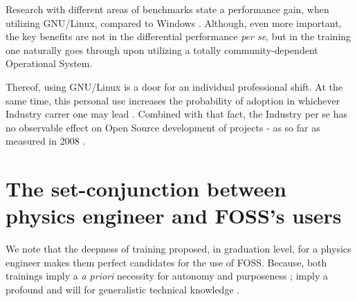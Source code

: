 \documentclass[
12pt,				%
openright,			%
oneside,			%
a4paper,			%
brazil,				%
english,			%
]{abntex2}
\begin{document}
Research with different areas of benchmarks state a performance gain, when utilizing GNU/Linux, compared to Windows \cite{sulaiman2021comparison}. Although, even more important, the key benefits are not in the differential performance \textit{per se}, but in the training one naturally goes through upon utilizing a totally community-dependent Operational System. 

Thereof, using GNU/Linux is a door for an individual professional shift. At the same time, this personal use increases the probability of adoption in whichever Industry carrer one may lead \cite{hauge2008adoption}. Combined with that fact, the Industry per se has no observable effect on Open Source development of projects - as so far as measured in 2008 \cite{hauge2008adoption}.



\section{The set-conjunction between physics engineer and FOSS's users}

We note that the deepness of training proposed, in graduation level, for a physics engineer makes them perfect candidates for the use of FOSS. Because, both trainings imply a \textit{a priori} necessity for autonomy and purposeness \cite{schrape2019open,racero2020predicting}; imply a profound and will for generalistic technical knowledge \cite{li2013all,gallego2015open}.
\end{document}
